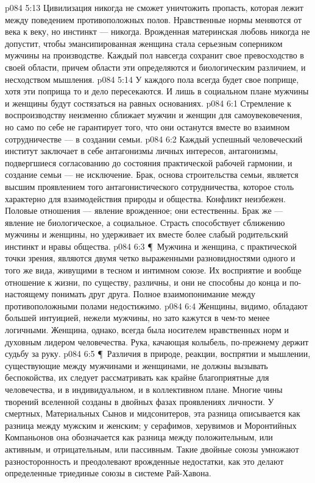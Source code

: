 \vs p084 5:13 Цивилизация никогда не сможет уничтожить пропасть, которая лежит между поведением противоположных полов. Нравственные нормы меняются от века к веку, но инстинкт --- никогда. Врожденная материнская любовь никогда не допустит, чтобы эмансипированная женщина стала серьезным соперником мужчины на производстве. Каждый пол навсегда сохранит свое превосходство в своей области, причем области эти определяются и биологическим различием, и несходством мышления.
\vs p084 5:14 У каждого пола всегда будет свое поприще, хотя эти поприща то и дело пересекаются. И лишь в социальном плане мужчины и женщины будут состязаться на равных основаниях.
\vs p084 6:1 Стремление к воспроизводству неизменно сближает мужчин и женщин для самоувековечения, но само по себе не гарантирует того, что они останутся вместе во взаимном сотрудничестве --- в создании семьи.
\vs p084 6:2 Каждый успешный человеческий институт заключает в себе антагонизмы личных интересов, антагонизмы, подвергшиеся согласованию до состояния практической рабочей гармонии, и создание семьи --- не исключение. Брак, основа строительства семьи, является высшим проявлением того антагонистического сотрудничества, которое столь характерно для взаимодействия природы и общества. Конфликт неизбежен. Половые отношения --- явление врожденное; они естественны. Брак же --- явление не биологическое, а социальное. Страсть способствует сближению мужчины и женщины, но удерживает их вместе более слабый родительский инстинкт и нравы общества.
\vs p084 6:3 \P\ Мужчина и женщина, с практической точки зрения, являются двумя четко выраженными разновидностями одного и того же вида, живущими в тесном и интимном союзе. Их восприятие и вообще отношение к жизни, по существу, различны, и они не способны до конца и по\hyp{}настоящему понимать друг друга. Полное взаимопонимание между противоположными полами недостижимо.
\vs p084 6:4 Женщины, видимо, обладают большей интуицией, нежели мужчины, но зато кажутся в чем\hyp{}то менее логичными. Женщина, однако, всегда была носителем нравственных норм и духовным лидером человечества. Рука, качающая колыбель, по\hyp{}прежнему держит судьбу за руку.
\vs p084 6:5 \P\ Различия в природе, реакции, воспрятии и мышлении, существующие между мужчинами и женщинами, не должны вызывать беспокойства, их следует рассматривать как крайне благоприятные для человечества, и в индивидуальном, и в коллективном плане. Многие чины творений вселенной созданы в двойных фазах проявлениях личности. У смертных, Материальных Сынов и мидсонитеров, эта разница описывается как разница между мужским и женским; у серафимов, херувимов и Моронтийных Компаньонов она обозначается как разница между положительным, или активным, и отрицательным, или пассивным. Такие двойные союзы умножают разносторонность и преодолевают врожденные недостатки, как это делают определенные триединые союзы в системе Рай\hyp{}Хавона.
